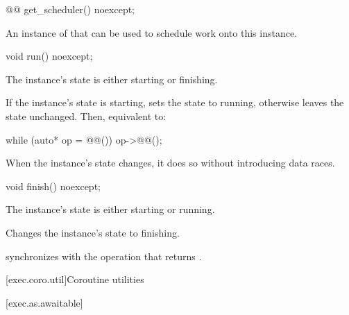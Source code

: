 %
\begin{itemdecl}
@@ get_scheduler() noexcept;
\end{itemdecl}

\begin{itemdescr}
\pnum
\returns
An instance of 
that can be used to schedule work onto this  instance.
\end{itemdescr}

%
\begin{itemdecl}
void run() noexcept;
\end{itemdecl}

\begin{itemdescr}
\pnum
\expects
The  instance's state is either starting or finishing.

\pnum
\effects
If the  instance's state is starting,
sets the state to running,
otherwise leaves the state unchanged.
Then, equivalent to:
\begin{codeblock}
while (auto* op = @@()) {
  op->@@();
}
\end{codeblock}

\pnum
\remarks
When the  instance's state changes,
it does so without introducing data races.
\end{itemdescr}

%
\begin{itemdecl}
void finish() noexcept;
\end{itemdecl}

\begin{itemdescr}
\pnum
\expects
The  instance's state is either starting or running.

\pnum
\effects
Changes the  instance's state to finishing.

\pnum
\sync
{} synchronizes with the  operation
that returns .
\end{itemdescr}

[exec.coro.util]{Coroutine utilities}

[exec.as.awaitable]{}

